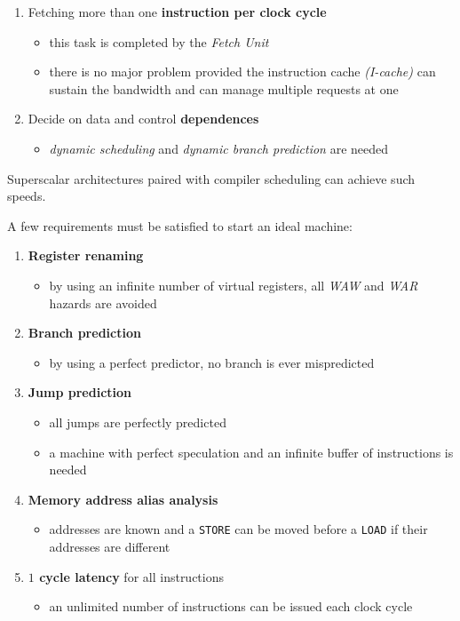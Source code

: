 \documentclass[english]{article}
\begin{document}
\begin{enumerate}
  \item Fetching more than one \textbf{instruction per clock cycle}
        \begin{itemize}
          \item this task is completed by the \textit{Fetch Unit}
          \item there is no major problem provided the instruction cache \textit{(I-cache)} can sustain the bandwidth and can manage multiple requests at one
        \end{itemize}
  \item Decide on data and control \textbf{dependences}
        \begin{itemize}
          \item \textit{dynamic scheduling} and \textit{dynamic branch prediction} are needed
        \end{itemize}
\end{enumerate}

Superscalar architectures paired with compiler scheduling can achieve such speeds.

\bigskip
A few requirements must be satisfied to start an ideal machine:

\begin{enumerate}
  \item \textbf{Register renaming}
        \begin{itemize}
          \item by using an infinite number of virtual registers, all \textit{WAW} and \textit{WAR} hazards are avoided
        \end{itemize}
  \item \textbf{Branch prediction}
        \begin{itemize}
          \item by using a perfect predictor, no branch is ever mispredicted
        \end{itemize}
  \item \textbf{Jump prediction}
        \begin{itemize}
          \item all jumps are perfectly predicted
          \item a machine with perfect speculation and an infinite buffer of instructions is needed
        \end{itemize}
  \item \textbf{Memory address alias analysis}
        \begin{itemize}
          \item addresses are known and a \texttt{STORE} can be moved before a \texttt{LOAD} if their addresses are different
        \end{itemize}
  \item \textbf{\(1\) cycle latency} for all instructions
        \begin{itemize}
          \item an unlimited number of instructions can be issued each clock cycle
        \end{itemize}
\end{enumerate}
\end{document}
